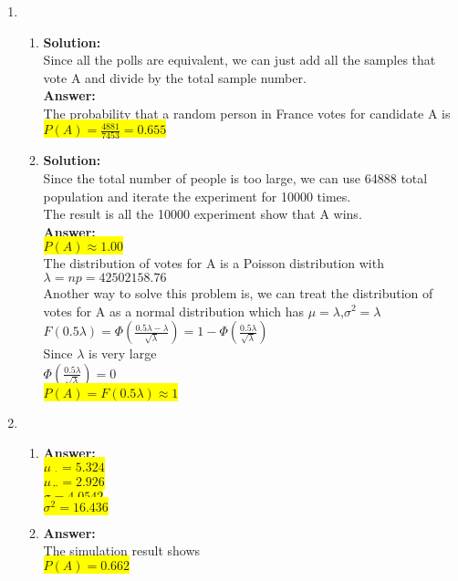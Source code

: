 \documentclass{article}
\newcommand{\myansw}{\textbf{Answer:}\\}
\newcommand{\mysolu}{\textbf{Solution:}\\}
\begin{document}
\begin{enumerate}
\begin{enumerate}
		
		
	\end{enumerate}
	\item
	\begin{enumerate}
		\item
		\mysolu
		Since all the polls are equivalent, we can just add all the samples that vote A and divide by the total sample number.\\
		\myansw
		The probability that a random person in France votes for candidate A is\\
		\colorbox{yellow}{$P(A) = \frac{4881}{7453}=0.655$}\\
		\item
		\mysolu
		Since the total number of people is too large, we can use 64888 total population and iterate the experiment for 10000 times.\\
		The result is all the 10000 experiment show that A wins.\\
		\myansw
		\colorbox{yellow}{$P(A) \approx 1.00$}\\
		The distribution of votes for A is a Poisson distribution with $\lambda = np = 42502158.76$\\
		Another way to solve this problem is, we can treat the distribution of votes for A as a normal distribution which has $\mu = \lambda$,$\sigma^2 = \lambda$ \\
		$F(0.5\lambda) = \Phi(\frac{0.5 \lambda - \lambda}{\sqrt{\lambda}}) = 1 - \Phi(\frac{0.5 \lambda}{\sqrt{\lambda}})$\\
		Since $\lambda$ is very large\\
		$\Phi(\frac{0.5 \lambda}{\sqrt{\lambda}})=0$\\
		\colorbox{yellow}{$P(A)=F(0.5\lambda) \approx 1$}\\
	\end{enumerate}
	\item
	\begin{enumerate}
		\item
		\myansw
		\colorbox{yellow}{$\mu_A = 5.324$}\\
		\colorbox{yellow}{$\mu_B = 2.926$}\\
		\colorbox{yellow}{$\sigma = 4.0542$}\\
		\colorbox{yellow}{$\sigma^2 = 16.436$}\\
		\item
		\myansw
		The simulation result shows\\
		\colorbox{yellow}{${P(A) = 0.662}$}\\

\end{enumerate}
\end{enumerate}
\end{document}
